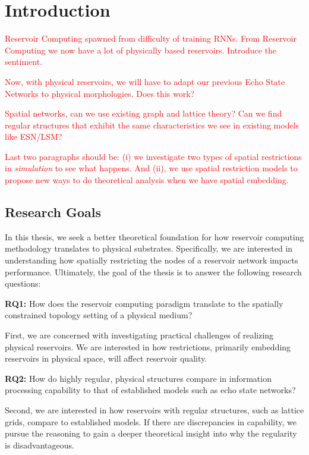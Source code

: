 \chapter{Introduction}
\label{ch:intro}

\textcolor{red}{
  Reservoir Computing spawned from difficulty of training RNNs. From Reservoir
Computing we now have a lot of physically based reservoirs. Introduce the
sentiment.
}

\textcolor{red}{
  Now, with physical reservoirs, we will have to adapt our previous Echo State
Networks to physical morphologies. Does this work?
}

\textcolor{red}{
  Spatial networks, can we use existing graph and lattice theory? Can we find
regular structures that exhibit the same characteristics we see in existing
models like ESN/LSM?
}

\textcolor{red}{
  Last two paragraphs should be: (i) we investigate two types of spatial
restrictions in \textit{simulation} to see what happens. And (ii), we use
spatial restriction models to propose new ways to do theoretical analysis when
we have spatial embedding.
}

\section{Research Goals}

In this thesis, we seek a better theoretical foundation for how reservoir
computing methodology translates to physical substrates. Specifically, we are
interested in understanding how spatially restricting the nodes of a reservoir
network impacts performance. Ultimately, the goal of the thesis is to answer the
following research questions:

\textbf{RQ1:} How does the reservoir computing paradigm translate to the
spatially constrained topology setting of a physical medium?

First, we are concerned with investigating practical challenges of realizing
physical reservoirs. We are interested in how restrictions, primarily embedding
reservoirs in physical space, will affect reservoir quality.

\textbf{RQ2:} How do highly regular, physical structures compare in information
processing capability to that of established models such as echo state networks?

Second, we are interested in how reservoirs with regular structures, such as
lattice grids, compare to established models. If there are discrepancies in
capability, we pursue the reasoning to gain a deeper theoretical insight into
why the regularity is disadvantageous.

